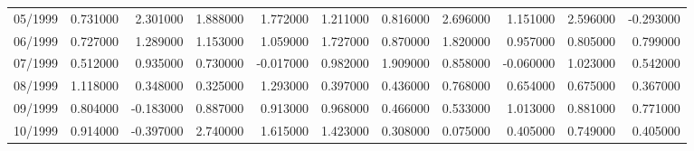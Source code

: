 \begin{tabular}{lrrrrrrrrrr}
05/1999 & 0.731000 & 2.301000 & 1.888000 & 1.772000 & 1.211000 & 0.816000 & 2.696000 & 1.151000 & 2.596000 & -0.293000 \\
06/1999 & 0.727000 & 1.289000 & 1.153000 & 1.059000 & 1.727000 & 0.870000 & 1.820000 & 0.957000 & 0.805000 & 0.799000 \\
07/1999 & 0.512000 & 0.935000 & 0.730000 & -0.017000 & 0.982000 & 1.909000 & 0.858000 & -0.060000 & 1.023000 & 0.542000 \\
08/1999 & 1.118000 & 0.348000 & 0.325000 & 1.293000 & 0.397000 & 0.436000 & 0.768000 & 0.654000 & 0.675000 & 0.367000 \\
09/1999 & 0.804000 & -0.183000 & 0.887000 & 0.913000 & 0.968000 & 0.466000 & 0.533000 & 1.013000 & 0.881000 & 0.771000 \\
10/1999 & 0.914000 & -0.397000 & 2.740000 & 1.615000 & 1.423000 & 0.308000 & 0.075000 & 0.405000 & 0.749000 & 0.405000 \\
\bottomrule
\end{tabular}
